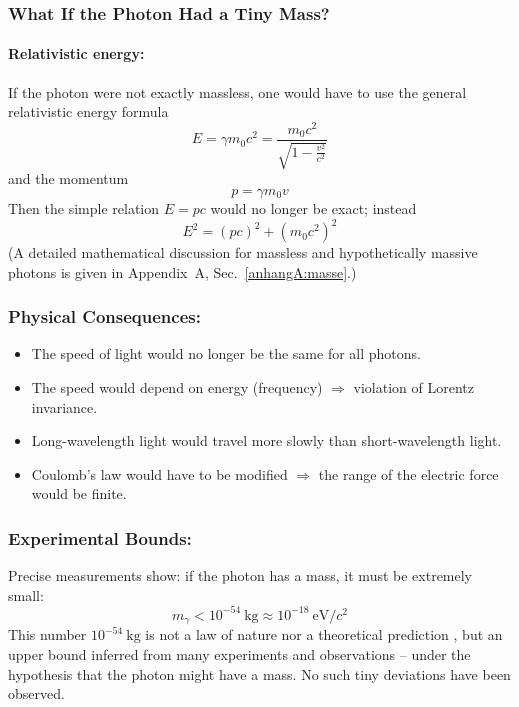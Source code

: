 \subsubsection{What If the Photon Had a Tiny Mass?}

\paragraph*{Relativistic energy:} If the photon were not exactly massless, one would have to use the general relativistic energy formula
$$
E = \gamma m_0 c^2 = \frac{m_0 c^2}{\sqrt{1 - \frac{v^2}{c^2}}}
$$
and the momentum
$$
p = \gamma m_0 v
$$
Then the simple relation $E = pc$ would no longer be exact; instead
$$
E^2 = (pc)^2 + (m_0 c^2)^2
$$
(A detailed mathematical discussion for massless and hypothetically massive photons is given in Appendix~A, Sec.~\ref{anhangA:masse}.)
\newpage
\noindent
\subsubsection*{Physical Consequences:}
\begin{itemize}
	\item The speed of light would no longer be the same for all photons.
	\item The speed would depend on energy (frequency) $\Rightarrow$ violation of Lorentz invariance.
	\item Long-wavelength light would travel more slowly than short-wavelength light.
	\item Coulomb's law would have to be modified $\Rightarrow$ the range of the electric force would be finite.
\end{itemize}

\subsubsection*{Experimental Bounds:}
Precise measurements show: if the photon has a mass, it must be extremely small:
$$
m_\gamma < 10^{-54}~\text{kg} \approx 10^{-18}~\text{eV}/c^2
$$
This number $10^{-54}~\text{kg}$ is not a law of nature nor a theoretical prediction , but an upper bound inferred from many experiments and observations – under the hypothesis that the photon might have a mass. No such tiny deviations have been observed.


